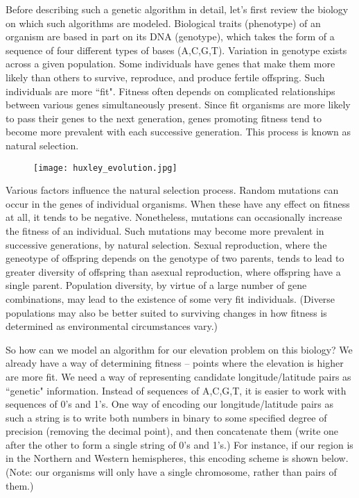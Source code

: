 
Before describing such a genetic algorithm in detail, let's first review the biology on which such algorithms are modeled. Biological traits (phenotype) of an organism are based in part on its DNA (genotype), which takes the form of a sequence of four different types of bases (A,C,G,T). Variation in genotype exists across a given population. Some individuals have genes that make them more likely than others to survive, reproduce, and produce fertile offspring. Such individuals are more ``fit". Fitness often depends on complicated relationships between various genes simultaneously present. Since fit organisms are more likely to pass their genes to the next generation, genes promoting fitness tend to become more prevalent with each successive generation. This process is known as natural selection.
\begin{figure}[H]
   \centering
   \texttt{[image: huxley\_evolution.jpg]} 
\end{figure}

Various factors influence the natural selection process. Random mutations can occur in the genes of individual organisms. When these have any effect on fitness at all, it tends to be negative. Nonetheless, mutations can occasionally increase the fitness of an individual. Such mutations may become more prevalent in successive generations, by natural selection. Sexual reproduction, where the geneotype of offspring depends on the genotype of two parents, tends to lead to greater diversity of offspring than asexual reproduction, where offspring have a single parent. Population diversity, by virtue of a large number of gene combinations, may lead to the existence of some very fit individuals. (Diverse populations may also be better suited to surviving changes in how fitness is determined as environmental circumstances vary.) \\


So how can we model an algorithm for our elevation problem on this biology? We already have a way of determining fitness -- points where the elevation is higher are more fit. We need a way of representing candidate longitude/latitude pairs as ``genetic" information. Instead of sequences of A,C,G,T, it is easier to work with sequences of 0's and 1's. One way of encoding our longitude/latitude pairs as such a string is to write both numbers in binary to some specified degree of precision (removing the decimal point), and then concatenate them (write one after the other to form a single string of 0's and 1's.) For instance, if our region is in the Northern and Western hemispheres, this encoding scheme is shown below. (Note: our organisms will only have a single chromosome, rather than pairs of them.) \\

